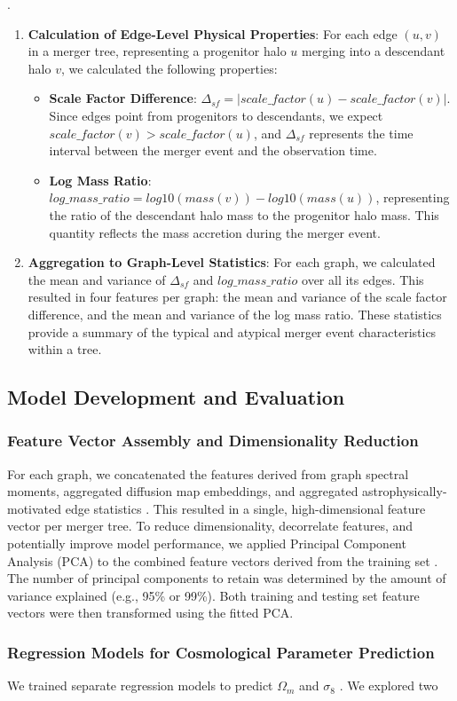 \documentclass[twocolumn]{aastex631}
\begin{document}
\citep{jespersen2022textttmangrovelearninggalaxyproperties,jung2024mergertreebasedgalaxymatching,chandrogómez2025accuracydarkmatterhalo}.\begin{enumerate}    \item \textbf{Calculation of Edge-Level Physical Properties}: For each edge $(u, v)$ in a merger tree, representing a progenitor halo $u$ merging into a descendant halo $v$, we calculated the following properties:    \begin{itemize}        \item \textbf{Scale Factor Difference}: $\Delta_{sf} = |scale\_factor(u) - scale\_factor(v)|$. Since edges point from progenitors to descendants, we expect $scale\_factor(v) > scale\_factor(u)$, and $\Delta_{sf}$ represents the time interval between the merger event and the observation time.        \item \textbf{Log Mass Ratio}: $log\_mass\_ratio = log10(mass(v)) - log10(mass(u))$, representing the ratio of the descendant halo mass to the progenitor halo mass. This quantity reflects the mass accretion during the merger event.    \end{itemize}    \item \textbf{Aggregation to Graph-Level Statistics}: For each graph, we calculated the mean and variance of $\Delta_{sf}$ and $log\_mass\_ratio$ over all its edges. This resulted in four features per graph: the mean and variance of the scale factor difference, and the mean and variance of the log mass ratio. These statistics provide a summary of the typical and atypical merger event characteristics within a tree.\end{enumerate}\subsection{Model Development and Evaluation}\subsubsection{Feature Vector Assembly and Dimensionality Reduction}For each graph, we concatenated the features derived from graph spectral moments, aggregated diffusion map embeddings, and aggregated astrophysically-motivated edge statistics  \citep{sun2024knowledgegraphastronomicalresearch}. This resulted in a single, high-dimensional feature vector per merger tree. To reduce dimensionality, decorrelate features, and potentially improve model performance, we applied Principal Component Analysis (PCA) to the combined feature vectors derived from the training set  \citep{ma2025characterizingdarkmattersubhalo}. The number of principal components to retain was determined by the amount of variance explained (e.g., 95\% or 99\%). Both training and testing set feature vectors were then transformed using the fitted PCA.\subsubsection{Regression Models for Cosmological Parameter Prediction}We trained separate regression models to predict $\Omega_m$ and $\sigma_8$  \citep{villaescusanavarro2021camelsprojectcosmologyastrophysics}. We explored two 
\end{document}
